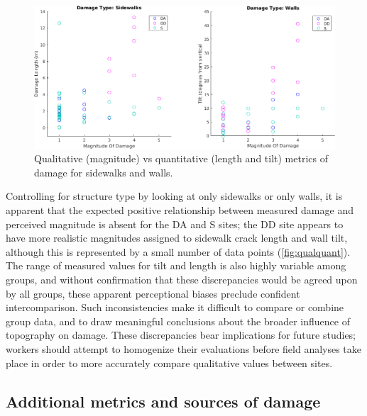 \documentclass[final,12pt,times,twocolumn,authoryear]{elsarticle}
\begin{document}
\begin{figure}[hbt]
	\centering
	\includegraphics[width=\linewidth]{fig/Actual_v_MagDam}
	\caption{Qualitative (magnitude) vs quantitative (length and tilt) metrics of damage for sidewalks and walls.}
	\label{fig:qualquant}
\end{figure}

Controlling for structure type by looking at only sidewalks or only walls, it is apparent that the expected positive relationship between measured damage and perceived magnitude is absent for the DA and S sites; the DD site appears to have more realistic magnitudes assigned to sidewalk crack length and wall tilt, although this is represented by a small number of data points (\autoref{fig:qualquant}). The range of measured values for tilt and length is also highly variable among groups, and without confirmation that these discrepancies would be agreed upon by all groups, these apparent perceptional biases preclude confident intercomparison. Such inconsistencies make it difficult to compare or combine group data, and to draw meaningful conclusions about the broader influence of topography on damage. These discrepancies bear implications for future studies; workers should attempt to homogenize their evaluations before field analyses take place in order to more accurately compare qualitative values between sites.




\subsection{Additional metrics and sources of damage}
\end{document}
